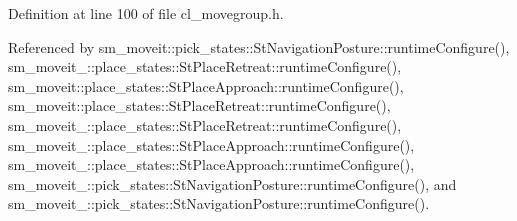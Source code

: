 Definition at line 100 of file cl\+\_\+movegroup.\+h.



Referenced by sm\+\_\+moveit\+::pick\+\_\+states\+::\+St\+Navigation\+Posture\+::runtime\+Configure(), sm\+\_\+moveit\+\_\+::place\+\_\+states\+::\+St\+Place\+Retreat\+::runtime\+Configure(), sm\+\_\+moveit\+::place\+\_\+states\+::\+St\+Place\+Approach\+::runtime\+Configure(), sm\+\_\+moveit\+::place\+\_\+states\+::\+St\+Place\+Retreat\+::runtime\+Configure(), sm\+\_\+moveit\+\_\+::place\+\_\+states\+::\+St\+Place\+Retreat\+::runtime\+Configure(), sm\+\_\+moveit\+\_\+::place\+\_\+states\+::\+St\+Place\+Approach\+::runtime\+Configure(), sm\+\_\+moveit\+\_\+::place\+\_\+states\+::\+St\+Place\+Approach\+::runtime\+Configure(), sm\+\_\+moveit\+\_\+::pick\+\_\+states\+::\+St\+Navigation\+Posture\+::runtime\+Configure(), and sm\+\_\+moveit\+\_\+::pick\+\_\+states\+::\+St\+Navigation\+Posture\+::runtime\+Configure().


